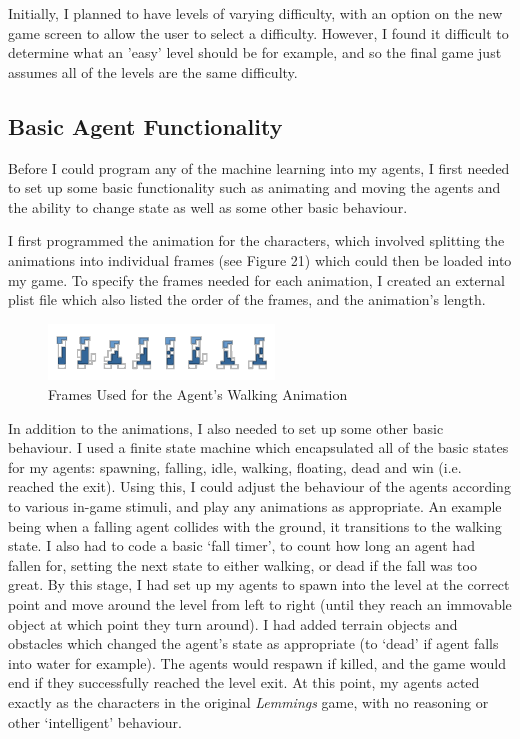 \documentclass[a4paper,oneside]{report}
\begin{document}
Initially, I planned to have levels of varying difficulty, with an option on the new game screen to allow the user to select a difficulty. However, I found it difficult to determine what an 'easy' level should be for example, and so the final game just assumes all of the levels are the same difficulty. 

\subsection{Basic Agent Functionality}

Before I could program any of the machine learning into my agents, I first needed to set up some basic functionality such as animating and moving the agents and the ability to change state as well as some other basic behaviour.

I first programmed the animation for the characters, which involved splitting the animations into individual frames (see Figure 21) which could then be loaded into my game. To specify the frames needed for each animation, I created an external plist file which also listed the order of the frames, and the animation's length. 

\begin{figure}[h!]
  \centering
    \includegraphics[width=60mm]{sources/images/Lemming_walk_anim}
    \caption{Frames Used for the Agent's Walking Animation}
\end{figure}

In addition to the animations, I also needed to set up some other basic behaviour. I used a finite state machine which encapsulated all of the basic states for my agents: spawning, falling, idle, walking, floating, dead and win (i.e. reached the exit). Using this, I could adjust the behaviour of the agents according to various in-game stimuli, and play any animations as appropriate. An example being when a falling agent collides with the ground, it transitions to the walking state. I also had to code a basic `fall timer', to count how long an agent had fallen for, setting the next state to either walking, or dead if the fall was too great. By this stage, I had set up my agents to spawn into the level at the correct point and move around the level from left to right (until they reach an immovable object at which point they turn around). I had added terrain objects and obstacles which changed the agent's state as appropriate (to `dead' if agent falls into water for example). The agents would respawn if killed, and the game would end if they successfully reached the level exit. At this point, my agents acted exactly as the characters in the original \emph{Lemmings} game, with no reasoning or other `intelligent' behaviour.
\end{document}
